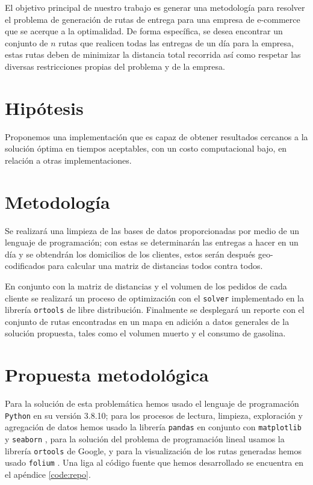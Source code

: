 \documentclass[journal]{IEEEtran}
\begin{document}
        El objetivo principal de nuestro trabajo es generar una metodología para resolver el problema de generación de rutas de entrega para una empresa de e-commerce que se acerque a la optimalidad. De forma específica, se desea encontrar un conjunto de $n$ rutas que realicen todas las entregas de un día para la empresa, estas rutas deben de minimizar la distancia total recorrida así como respetar las diversas restricciones propias del problema y de la empresa.

    \section{Hipótesis} \label{sec:hyp}
            
        Proponemos una implementación que es capaz de obtener resultados cercanos a la solución óptima en tiempos aceptables, con un costo computacional bajo, en relación a otras implementaciones. 
    
    \section{Metodología} \label{sec:method}

        Se realizará una limpieza de las bases de datos proporcionadas por medio de un lenguaje de programación; con estas se determinarán las entregas a hacer en un día y se obtendrán los domicilios de los clientes, estos serán después geo-codificados para calcular una matriz de distancias todos contra todos.

        En conjunto con la matriz de distancias y el volumen de los pedidos de cada cliente se realizará un proceso de optimización con el \texttt{solver} implementado en la librería \texttt{ortools} \cite{google-2021} de libre distribución. Finalmente se desplegará un reporte con el conjunto de rutas encontradas en un mapa en adición a datos generales de la solución propuesta, tales como el volumen muerto y el consumo de gasolina.

    \section{Propuesta metodológica} \label{sec:prop-method}
    
        Para la solución de esta problemática hemos usado el lenguaje de programación \texttt{Python} en su versión 3.8.10; para los procesos de lectura, limpieza, exploración y agregación de datos hemos usado la librería \texttt{pandas} \cite{mckinney-proc-scipy-2010} en conjunto con \texttt{matplotlib} \cite{Hunter:2007} y \texttt{seaborn} \cite{Waskom2021}, para la solución del problema de programación lineal usamos la librería \texttt{ortools} \cite{ortools} de Google, y para la visualización de los rutas generadas hemos usado \texttt{folium} \cite{folium}. Una liga al código fuente que hemos desarrollado se encuentra en el apéndice \ref{code:repo}.
        
\end{document}
